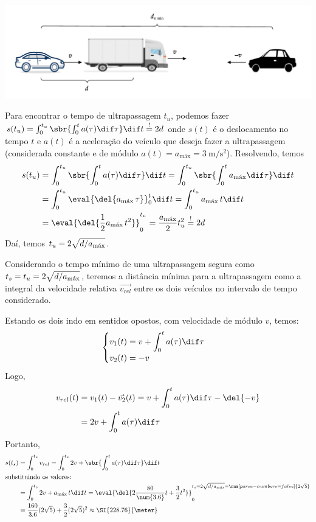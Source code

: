 \documentclass[]{IMTexam}
\begin{document}
\begin{questions}
\begin{solution}
		\centerline{\includegraphics[width=0.8\linewidth]{diagram1}}

		Para encontrar o tempo de ultrapassagem $ t_u $, podemos fazer $ s(t_u)=\int_{0}^{t_u}\sbr{\int_{0}^{t}a(\tau)\dif\tau}\dif t\overset{!}{=}2d $ onde $ s(t) $ é o deslocamento no tempo $ t $ e $ a(t) $ é a aceleração do veículo que deseja fazer a ultrapassagem (considerada constante e de módulo $ a(t)=a_{\text{máx}}=\SI{3}{\meter\per\second\squared} $).
		Resolvendo, temos
		\begin{align*}
			s(t_u) & =\int_{0}^{t_u}\sbr{\int_{0}^{t}a(\tau)\dif\tau}\dif t=\int_{0}^{t_u}\sbr{\int_{0}^{t}a_{\textup{máx}}\dif\tau}\dif t \\
			       & =\int_{0}^{t_u}\eval{\del{a_{\textup{máx}}\,\tau}}_{0}^{t}\dif t=\int_{0}^{t_u}a_{\textup{máx}}\,t\dif t              \\
			       & =\eval{\del{\dfrac{1}{2}a_{\textup{máx}}\,t^{2}}}_{0}^{t_u}=\dfrac{a_{\textup{máx}}}{2}t_u^{2}\overset{!}{=}2d
		\end{align*}
		Daí, temos $ t_u=2\sqrt{d/a_{\textup{máx}}} $.

		Considerando o tempo mínimo de uma ultrapassagem segura como $ t_s=t_u=2\sqrt{d/a_{\textup{máx}}} $, teremos a distância mínima para a ultrapassagem como a integral da velocidade relativa $ \vec{v_{rel}} $ entre os dois veículos no intervalo de tempo considerado.

		Estando os dois indo em sentidos opostos, com velocidade de módulo $ v $, temos:
		\[ \begin{cases}
				v_1(t)=v+\displaystyle\int_{0}^{t}a(\tau)\dif \tau \\
				v_2(t)=-v
			\end{cases} \]
		Logo,
		\begin{align*}
			v_{rel}(t) & =v_1(t)-\vec{v_2}(t)=v+\int_{0}^{t}a(\tau)\dif \tau-\del{-v} \\
			           & =2v+\int_{0}^{t}a(\tau)\dif \tau
		\end{align*}
		Portanto,
		\begin{align*}
			s(t_s) & =\int_{0}^{t_s}v_{rel}=\int_{0}^{t_s}2v+\sbr{\int_{0}^{t}a(\tau)\dif\tau}\dif t                                                                                              \\
			\intertext{substituindo os valores:}
			       & =\int_{0}^{t_s}2v+a_{\textup{máx}}\,t\dif t=\eval{\del{2\dfrac{80}{\num{3.6}}t+\dfrac{3}{2}t^{2}}}_{0}^{t_s=2\sqrt{d/a_{\textup{máx}}}=\num[parse-numbers=false]{2\sqrt{5}}} \\
			       & =\dfrac{160}{3.6}(2\sqrt{5})+\dfrac{3}{2}(2\sqrt{5})^{2}\approx\SI{228.76}{\meter}
		\end{align*}
	\end{solution}


\end{questions}
\end{document}
